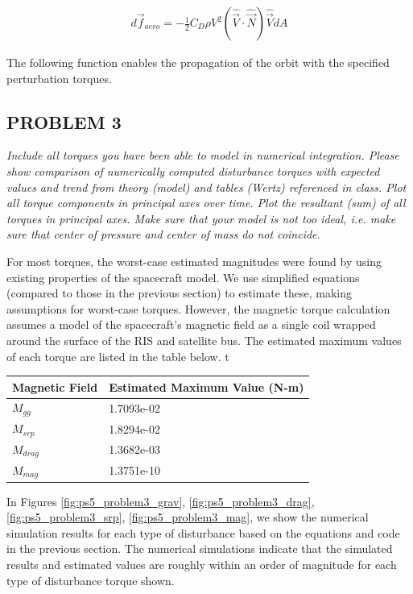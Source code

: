 \begin{align*}
    d \Vec{f}_{aero} = - \frac{1}{2} C_D \rho V^2 (\hat{\Vec{V}} \cdot \hat{\Vec{N}}) \hat{\Vec{V}} dA
\end{align*}


The following function enables the propagation of the orbit with the specified perturbation torques.






\subsection{PROBLEM 3}
\textit{Include all torques you have been able to model in numerical integration. Please show comparison of numerically computed disturbance torques with expected values and trend from theory (model) and tables (Wertz) referenced in class. Plot all torque components in principal axes over time. Plot the resultant (sum) of all torques in principal axes. Make sure that your model is not too ideal, i.e. make sure that center of pressure and center of mass do not coincide.}

For most torques, the worst-case estimated magnitudes were found by using existing properties of the spacecraft model. We use simplified equations (compared to those in the previous section) to estimate these, making assumptions for worst-case torques. However, the magnetic torque calculation assumes a model of the spacecraft's magnetic field as a single coil wrapped around the surface of the RIS and satellite bus. The estimated maximum values of each torque are listed in the table below.
t
\begin{table}[H]
\centering
\begin{tabular}{l|l} 

Magnetic Field & Estimated Maximum Value (N-m)  \\ 
\hline
$M_{gg}$          & 1.7093e-02                  \\ 
\hline
$M_{srp}$         & 1.8294e-02                  \\ 
\hline
$M_{drag}$        & 1.3682e-03                  \\ 
\hline
$M_{mag}$         & 1.3751e-10                  \\
\end{tabular}
\end{table}

In Figures \ref{fig:ps5_problem3_grav}, \ref{fig:ps5_problem3_drag}, \ref{fig:ps5_problem3_srp}, \ref{fig:ps5_problem3_mag}, we show the numerical simulation results for each type of disturbance based on the equations and code in the previous section. The numerical simulations indicate that the simulated results and estimated values are roughly within an order of magnitude for each type of disturbance torque shown.

